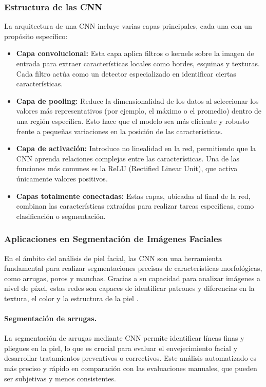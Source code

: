 \subsubsection{Estructura de las CNN}  
La arquitectura de una CNN incluye varias capas principales, cada una con un propósito específico:
\begin{itemize}
    \item \textbf{Capa convolucional:} Esta capa aplica filtros o kernels sobre la imagen de entrada para extraer características locales como bordes, esquinas y texturas. Cada filtro actúa como un detector especializado en identificar ciertas características.
    \item \textbf{Capa de pooling:} Reduce la dimensionalidad de los datos al seleccionar los valores más representativos (por ejemplo, el máximo o el promedio) dentro de una región específica. Esto hace que el modelo sea más eficiente y robusto frente a pequeñas variaciones en la posición de las características.
    \item \textbf{Capa de activación:} Introduce no linealidad en la red, permitiendo que la CNN aprenda relaciones complejas entre las características. Una de las funciones más comunes es la ReLU (Rectified Linear Unit), que activa únicamente valores positivos.
    \item \textbf{Capas totalmente conectadas:} Estas capas, ubicadas al final de la red, combinan las características extraídas para realizar tareas específicas, como clasificación o segmentación.
\end{itemize}

\subsubsection{Aplicaciones en Segmentación de Imágenes Faciales}  
En el ámbito del análisis de piel facial, las CNN son una herramienta fundamental para realizar segmentaciones precisas de características morfológicas, como arrugas, poros y manchas. Gracias a su capacidad para analizar imágenes a nivel de píxel, estas redes son capaces de identificar patrones y diferencias en la textura, el color y la estructura de la piel \cite{autor2021deep}.

\paragraph{Segmentación de arrugas.}  
La segmentación de arrugas mediante CNN permite identificar líneas finas y pliegues en la piel, lo que es crucial para evaluar el envejecimiento facial y desarrollar tratamientos preventivos o correctivos. Este análisis automatizado es más preciso y rápido en comparación con las evaluaciones manuales, que pueden ser subjetivas y menos consistentes.

